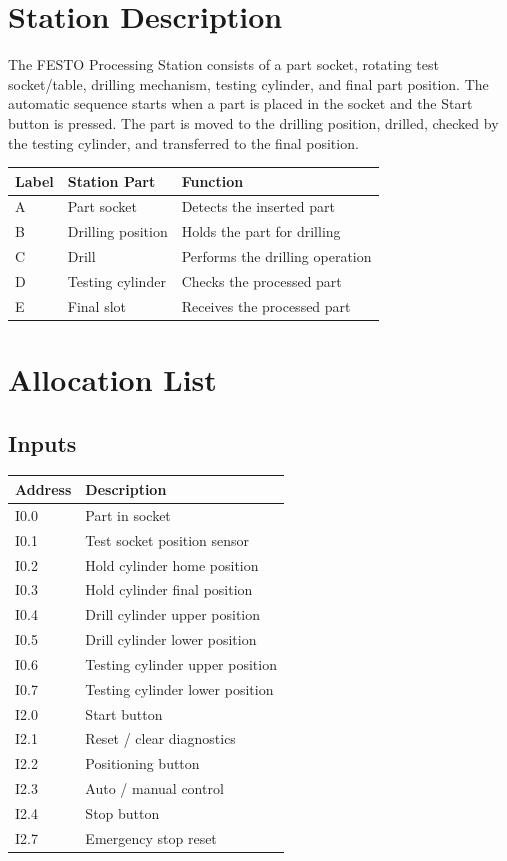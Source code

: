 \section{Station Description}

The FESTO Processing Station consists of a part socket, rotating test socket/table, drilling mechanism, testing cylinder, and final part position. The automatic sequence starts when a part is placed in the socket and the Start button is pressed. The part is moved to the drilling position, drilled, checked by the testing cylinder, and transferred to the final position.

\begin{longtable}{|p{1.2cm}|p{4.2cm}|p{7.2cm}|}
\hline
Label & Station Part & Function \\
\hline
A & Part socket & Detects the inserted part \\
\hline
B & Drilling position & Holds the part for drilling \\
\hline
C & Drill & Performs the drilling operation \\
\hline
D & Testing cylinder & Checks the processed part \\
\hline
E & Final slot & Receives the processed part \\
\hline
\end{longtable}

\section{Allocation List}

\subsection{Inputs}

\begin{longtable}{|p{2.0cm}|p{10.8cm}|}
\hline
Address & Description \\
\hline
I0.0 & Part in socket \\
\hline
I0.1 & Test socket position sensor \\
\hline
I0.2 & Hold cylinder home position \\
\hline
I0.3 & Hold cylinder final position \\
\hline
I0.4 & Drill cylinder upper position \\
\hline
I0.5 & Drill cylinder lower position \\
\hline
I0.6 & Testing cylinder upper position \\
\hline
I0.7 & Testing cylinder lower position \\
\hline
I2.0 & Start button \\
\hline
I2.1 & Reset / clear diagnostics \\
\hline
I2.2 & Positioning button \\
\hline
I2.3 & Auto / manual control \\
\hline
I2.4 & Stop button \\
\hline
I2.7 & Emergency stop reset \\
\hline
\end{longtable}

